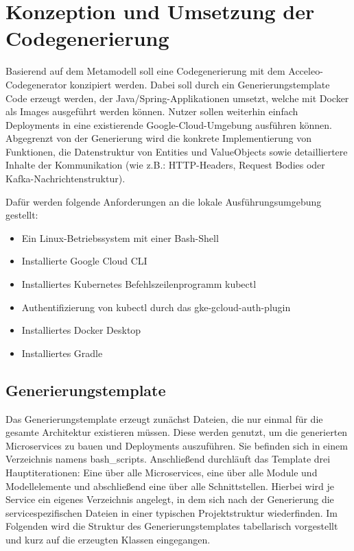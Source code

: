 \chapter{Konzeption und Umsetzung der Codegenerierung}

Basierend auf dem Metamodell soll eine Codegenerierung mit dem Acceleo-Codegenerator konzipiert werden. Dabei soll durch ein Generierungstemplate Code erzeugt werden, der Java/Spring-Applikationen umsetzt, welche mit Docker als Images ausgeführt werden können. Nutzer sollen weiterhin einfach Deployments in eine existierende Google-Cloud-Umgebung ausführen können. Abgegrenzt von der Generierung wird die konkrete Implementierung von Funktionen, die Datenstruktur von Entities und ValueObjects sowie detailliertere Inhalte der Kommunikation (wie z.B.: HTTP-Headers, Request Bodies oder Kafka-Nachrichtenstruktur).

Dafür werden folgende Anforderungen an die lokale Ausführungsumgebung gestellt:
\begin{itemize}
  \item Ein Linux-Betriebssystem mit einer Bash-Shell
  \item Installierte Google Cloud CLI \cite{gcloudsdk}
  \item Installiertes Kubernetes Befehlszeilenprogramm kubectl \cite{kubernetes}
  \item Authentifizierung von kubectl durch das gke-gcloud-auth-plugin \cite{kubernetesauth}
  \item Installiertes Docker Desktop \cite{docker}
  \item Installiertes Gradle \cite{gradle}
\end{itemize}

\section{Generierungstemplate}

Das Generierungstemplate erzeugt zunächst Dateien, die nur einmal für die gesamte Architektur existieren müssen. Diese werden genutzt, um die generierten Microservices zu bauen und Deployments auszuführen. Sie befinden sich in einem Verzeichnis namens \glqq bash_scripts\grqq{}. Anschließend durchläuft das Template drei Hauptiterationen: Eine über alle Microservices, eine über alle Module und Modellelemente und abschließend eine über alle Schnittstellen. Hierbei wird je Service ein eigenes Verzeichnis angelegt, in dem sich nach der Generierung die servicespezifischen Dateien in einer typischen Projektstruktur wiederfinden. Im Folgenden wird die Struktur des Generierungstemplates tabellarisch vorgestellt und kurz auf die erzeugten Klassen eingegangen.

